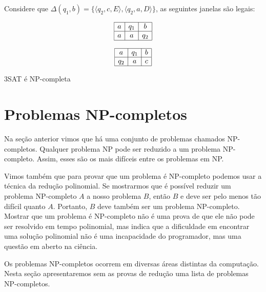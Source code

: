 \begin{example}
  \label{ex:janela}
  Considere que $\Delta(q_1, b) = \{\langle q_2, c, E\rangle, \langle q_2, a, D \rangle\}$, as seguintes janelas são legais:

  \begin{displaymath}
    \begin{array}{|c|c|c|}
      \hline
      a & q_1 & b \\
      \hline
      a & a & q_2 \\
      \hline
    \end{array}
  \end{displaymath}

    \begin{displaymath}
    \begin{array}{|c|c|c|}
      \hline
      a & q_1 & b \\
      \hline
      q_2 & a & c \\
      \hline
    \end{array}
  \end{displaymath}

\end{example}

\begin{corollary}
  3SAT é NP-completa
\end{corollary}


\section{Problemas NP-completos}
\label{sec:problemas}

Na seção anterior vimos que há uma conjunto de problemas chamados NP-completos.
Qualquer problema NP pode ser reduzido a um problema NP-completo.
Assim, esses são os mais difíceis entre os problemas em NP.

Vimos também que para provar que um problema é NP-completo podemos usar a técnica da redução polinomial.
Se mostrarmos que é possível reduzir um problema NP-completo $A$ a nosso problema $B$, então $B$ e deve ser pelo menos tão difícil quanto $A$.
Portanto, $B$ deve também ser um problema NP-completo.
Mostrar que um problema é NP-completo não é uma prova de que ele não pode ser resolvido em tempo polinomial, mas indica que a dificuldade em encontrar uma solução polinomial não é uma incapacidade do programador, mas uma questão em aberto na ciência.

Os problemas NP-completos ocorrem em diversas áreas distintas da computação.
Nesta seção apresentaremos sem as provas de redução uma lista de problemas NP-completos.


